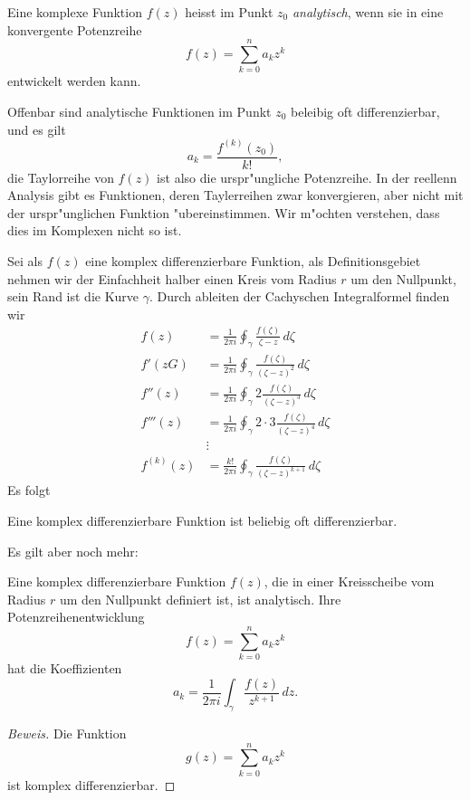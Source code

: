\begin{definition}
Eine komplexe Funktion $f(z)$ heisst im Punkt $z_0$ {\em analytisch}, wenn
sie in eine konvergente Potenzreihe
\[
f(z)=\sum_{k=0}^n a_kz^k
\]
entwickelt werden kann.
\end{definition}

Offenbar sind analytische Funktionen im Punkt $z_0$ beleibig oft
differenzierbar, und es gilt
\[
a_k=\frac{f^{(k)}(z_0)}{k!},
\]
die Taylorreihe von $f(z)$ ist also die urspr"ungliche Potenzreihe.
In der reellenn Analysis gibt es Funktionen, deren Taylerreihen zwar
konvergieren, aber nicht mit der urspr"unglichen Funktion "ubereinstimmen.
Wir m"ochten verstehen, dass dies im Komplexen nicht so ist.

Sei als $f(z)$ eine komplex differenzierbare Funktion, als Definitionsgebiet
nehmen wir der Einfachheit halber einen Kreis vom Radius $r$ um den Nullpunkt,
sein Rand ist die Kurve $\gamma$.
Durch ableiten der Cachyschen Integralformel finden wir
\begin{align*}
f(z)
&=
\frac1{2\pi i}\oint_{\gamma}\frac{f(\zeta)}{\zeta-z}\,d\zeta
\\
f'(zG)
&=
\frac1{2\pi i}\oint_{\gamma}\frac{f(\zeta)}{(\zeta-z)^2}\,d\zeta
\\
f'' (z)
&=
\frac1{2\pi i}\oint_{\gamma}2\frac{f(\zeta)}{(\zeta-z)^3}\,d\zeta
\\
f'''(z)
&=
\frac1{2\pi i}\oint_{\gamma}2\cdot 3\frac{f(\zeta)}{(\zeta-z)^4}\,d\zeta
\\
&\vdots
\\
f^{(k)}(z)
&=
\frac{k!}{2\pi i}\oint_{\gamma}\frac{f(\zeta)}{(\zeta-z)^{k+1}}\,d\zeta
\end{align*}
Es folgt

\begin{satz}
Eine komplex differenzierbare Funktion ist beliebig oft differenzierbar.
\end{satz}

Es gilt aber noch mehr:

\begin{satz}
Eine komplex differenzierbare Funktion $f(z)$, die in einer Kreisscheibe
vom Radius $r$ um den Nullpunkt definiert ist, ist analytisch.
Ihre Potenzreihenentwicklung
\[
f(z)=\sum_{k=0}^na_kz^k
\]
hat die Koeffizienten
\[
a_k=\frac1{2\pi i}\int_{\gamma}\frac{f(z)}{z^{k+1}}\,dz.
\]
\end{satz}

\begin{proof}[Beweis]
Die Funktion
\[
g(z)=\sum_{k=0}^na_kz^k
\]
ist komplex differenzierbar.
\end{proof}













